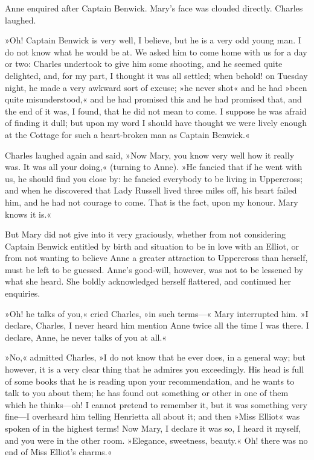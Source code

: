 Anne enquired after Captain Benwick. Mary's face was clouded directly. Charles laughed.

»Oh! Captain Benwick is very well, I believe, but he is a very odd young man. I do not know what he would be at. We asked him to come home with us for a day or two: Charles undertook to give him some shooting, and he seemed quite delighted, and, for my part, I thought it was all settled; when behold! on Tuesday night, he made a very awkward sort of excuse; »he never shot« and he had »been quite misunderstood,« and he had promised this and he had promised that, and the end of it was, I found, that he did not mean to come. I suppose he was afraid of finding it dull; but upon my word I should have thought we were lively enough at the Cottage for such a heart-broken man as Captain Benwick.«

Charles laughed again and said, »Now Mary, you know very well how it really was. It was all your doing,« (turning to Anne). »He fancied that if he went with us, he should find you close by: he fancied everybody to be living in Uppercross; and when he discovered that Lady Russell lived three miles off, his heart failed him, and he had not courage to come. That is the fact, upon my honour. Mary knows it is.«

But Mary did not give into it very graciously, whether from not considering Captain Benwick entitled by birth and situation to be in love with an Elliot, or from not wanting to believe Anne a greater attraction to Uppercross than herself, must be left to be guessed. Anne's good-will, however, was not to be lessened by what she heard. She boldly acknowledged herself flattered, and continued her enquiries.

»Oh! he talks of you,« cried Charles, »in such terms—« Mary interrupted him. »I declare, Charles, I never heard him mention Anne twice all the time I was there. I declare, Anne, he never talks of you at all.«

»No,« admitted Charles, »I do not know that he ever does, in a general way; but however, it is a very clear thing that he admires you exceedingly. His head is full of some books that he is reading upon your recommendation, and he wants to talk to you about them; he has found out something or other in one of them which he thinks—oh! I cannot pretend to remember it, but it was something very fine—I overheard him telling Henrietta all about it; and then »Miss Elliot« was spoken of in the highest terms! Now Mary, I declare it was so, I heard it myself, and you were in the other room. »Elegance, sweetness, beauty.« Oh! there was no end of Miss Elliot's charms.«

